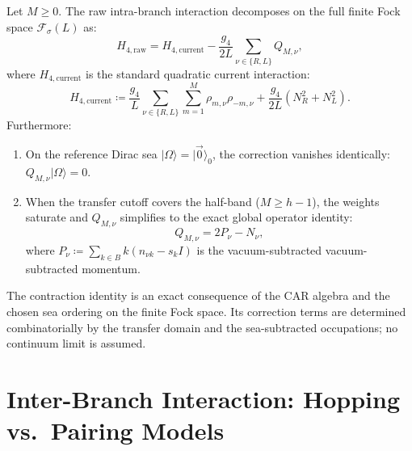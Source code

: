 \begin{theorem}
\label{thm:raw_vs_current_intra}
Let $M \ge 0$. The raw intra-branch interaction decomposes on the full finite Fock space $\mathcal{F}_\sigma(L)$ as:
\begin{equation}
H_{4, \mathrm{raw}} = H_{4, \mathrm{current}} - \frac{g_4}{2L} \sum_{\nu \in \{R, L\}} Q_{M, \nu},
\end{equation}
where $H_{4, \mathrm{current}}$ is the standard quadratic current interaction:
\begin{equation}
H_{4, \mathrm{current}} \coloneqq \frac{g_4}{L} \sum_{\nu \in \{R, L\}} \sum_{m=1}^M \rho_{m, \nu} \rho_{-m, \nu} + \frac{g_4}{2L} \left( N_R^2 + N_L^2 \right).
\end{equation}
Furthermore:
\begin{enumerate}
    \item On the reference Dirac sea $|\Omega\rangle = |\vec{0}\rangle_0$, the correction vanishes identically: $Q_{M, \nu} |\Omega\rangle = 0$.
    \item When the transfer cutoff covers the half-band ($M \ge h - 1$), the weights saturate and $Q_{M, \nu}$ simplifies to the exact global operator identity:
    \begin{equation}
    Q_{M, \nu} = 2P_\nu - N_\nu,
    \end{equation}
    where $P_\nu \coloneqq \sum_{k \in B} k (n_{\nu k} - s_k I)$ is the vacuum-subtracted vacuum-subtracted momentum.
\end{enumerate}
\end{theorem}

\begin{remark}
The contraction identity is an exact consequence of the CAR algebra and the chosen sea ordering on the finite Fock space. Its correction terms are determined combinatorially by the transfer domain and the sea-subtracted occupations; no continuum limit is assumed.
\end{remark}

\section{Inter-Branch Interaction: Hopping vs.\ Pairing Models}

